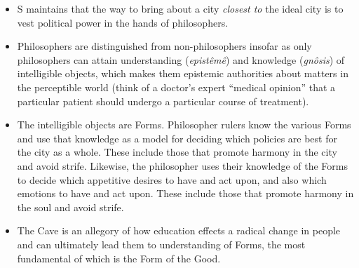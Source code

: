 \documentclass[oneside]{article}
\begin{document}
\begin{itemize}
 \item S maintains that the way to bring about a city \emph{closest to} the ideal city is to vest political power in the hands of philosophers.
\item Philosophers are distinguished from non-philosophers insofar as only philosophers can attain understanding (\emph{epist\^{e}m\^{e}}) and knowledge (\emph{gn\^{o}sis}) of intelligible objects, which makes them epistemic authorities about matters in the perceptible world (think of a doctor's expert ``medical opinion'' that a particular patient should undergo a particular course of treatment). 
\item The intelligible objects are Forms. Philosopher rulers know the various Forms and use that knowledge as a model for deciding which policies are best for the city as a whole. These include those that promote harmony in the city and avoid strife. Likewise, the philosopher uses their knowledge of the Forms to decide which appetitive desires to have and act upon, and also which emotions to have and act upon. These include those that promote harmony in the soul and avoid strife. 
\item The Cave is an allegory of how education effects a radical change in people and can ultimately lead them to understanding of Forms, the most fundamental of which is the Form of the Good.
\end{itemize}
\end{document}
